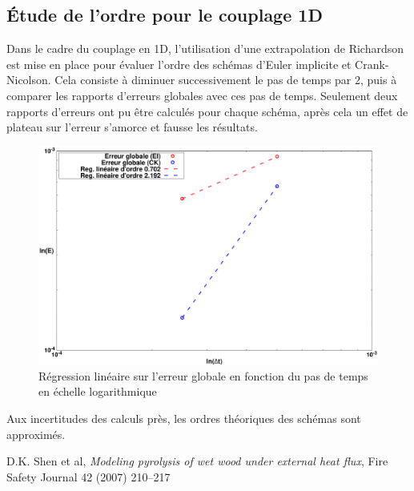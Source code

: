 \documentclass[a4paper,11pt]{article}
\begin{document}
\subsection*{Étude de l'ordre pour le couplage 1D}
Dans le cadre du couplage en 1D, l'utilisation d'une extrapolation de Richardson est mise en place pour évaluer l'ordre des schémas d'Euler implicite et Crank-Nicolson. Cela consiste à diminuer successivement le pas de temps par 2, puis à comparer les rapports d'erreurs globales avec ces pas de temps. Seulement deux rapports d'erreurs ont pu être calculés pour chaque schéma, après cela un effet de plateau sur l'erreur s'amorce et fausse les résultats.

\begin{figure}[H]
    \centering
    \includegraphics[width=0.8\linewidth]{images/ordre.pdf}
    \caption{Régression linéaire sur l'erreur globale en fonction du pas de temps en échelle logarithmique}
\end{figure}

Aux incertitudes des calculs près, les ordres théoriques des schémas sont approximés.
\newpage
\begin{thebibliography}{99}


     D.K. Shen et al, \textit{Modeling pyrolysis of wet wood under external heat flux}, Fire Safety Journal 42 (2007) 210–217

\end{thebibliography}
\end{document}
